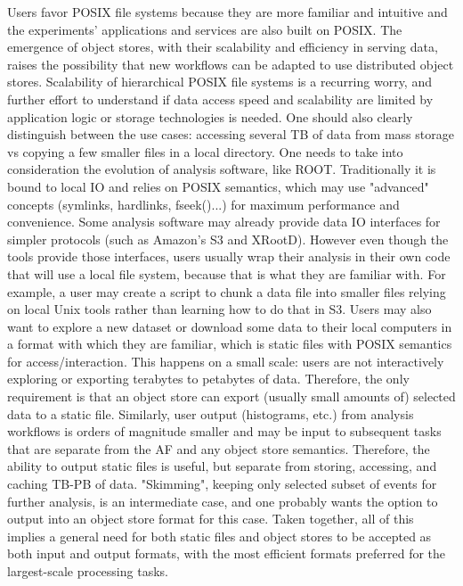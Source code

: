 Users favor POSIX file systems because they are more familiar and intuitive and the experiments’ applications and services are also built on POSIX. The emergence of object stores, with their scalability and efficiency in serving data, raises the possibility that new workflows can be adapted to use distributed object stores. Scalability of hierarchical POSIX file systems is a recurring worry, and further effort to understand if data access speed and scalability are limited by application logic or storage technologies is needed. One should also clearly distinguish between the use cases: accessing several TB of data from mass storage vs copying a few smaller files in a local directory. One needs to take into consideration the evolution of analysis software, like ROOT. Traditionally it is bound to local IO and relies on POSIX semantics, which may use "advanced" concepts (symlinks, hardlinks, fseek()...) for maximum performance and convenience. Some analysis software may already provide data IO interfaces for simpler protocols (such as Amazon's S3 and XRootD). However even though the tools provide those interfaces, users usually wrap their analysis in their own code that will use a local file system, because that is what they are familiar with. For example, a user may create a script to chunk a data file into smaller files relying on local Unix tools rather than learning how to do that in S3. Users may also want to explore a new dataset or download some data to their local computers in a format with which they are familiar, which is static files with POSIX semantics for access/interaction. This happens on a small scale: users are not interactively exploring or exporting terabytes to petabytes of data. Therefore, the only requirement is that an object store can export (usually small amounts of) selected data to a static file. Similarly, user output (histograms, etc.) from analysis workflows is orders of magnitude smaller and may be input to subsequent tasks that are separate from the AF and any object store semantics. Therefore, the ability to output static files is useful, but separate from storing, accessing, and caching TB-PB of data. "Skimming", keeping only selected subset of events for further analysis, is an intermediate case, and one probably wants the option to output into an object store format for this case. Taken together, all of this implies a general need for both static files and object stores to be accepted as both input and output formats, with the most efficient formats preferred for the largest-scale processing tasks. 

